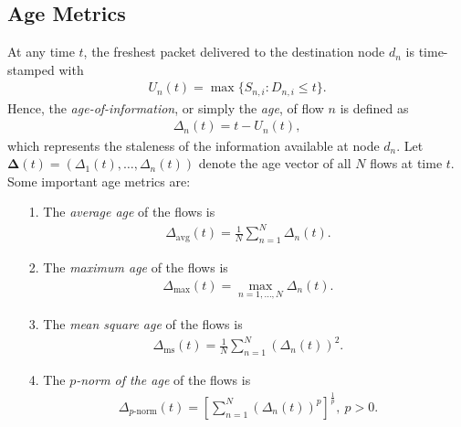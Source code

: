{\subsection{Age Metrics}
At any time $t$, the freshest packet delivered to the destination node $d_n$ is time-stamped with 
\begin{align}
U_{n} (t) = \max\{S_{n,i}: D_{n,i} \leq t\}. \nonumber
\end{align}
Hence, the \emph{age-of-information}, or simply the \emph{age}, of flow $n$ is defined as
\begin{align}%
\Delta_{n} (t) = t - U_{n} (t) ,\nonumber
\end{align}
which represents the staleness of the information available at node $d_n$.
Let $\bm{\Delta}(t)=(\Delta_{1} (t),\ldots,\Delta_{n} (t))$ denote the age vector of all $N$ flows at time $t$. 
Some important age metrics are: %
\begin{itemize}
\item[1.] The \emph{average age} of the flows is
\begin{align}%
\Delta_{\text{avg}} (t) = \frac{1}{N}\sum_{n=1}^N \Delta_{n} (t).\nonumber
\end{align}

\item[2.] The \emph{maximum age} of the flows is
\begin{align}%
\Delta_{\max} (t) = \max_{n=1,\ldots,N} \Delta_{n} (t).\nonumber
\end{align}

\item[3.] The \emph{mean square age} of the flows is
\begin{align}%
\Delta_{\text{ms}} (t) = \frac{1}{N}\sum_{n=1}^N (\Delta_{n} (t))^2.\nonumber
\end{align}

\item[4.] The \emph{$p$-norm of the age} of the flows is
\begin{align}%
\Delta_{\text{$p$-norm}} (t) = \left[\sum_{n=1}^N (\Delta_{n} (t))^p\right]^{\frac{1}{p}}, ~p>0.\nonumber
\end{align}


\end{itemize}}
